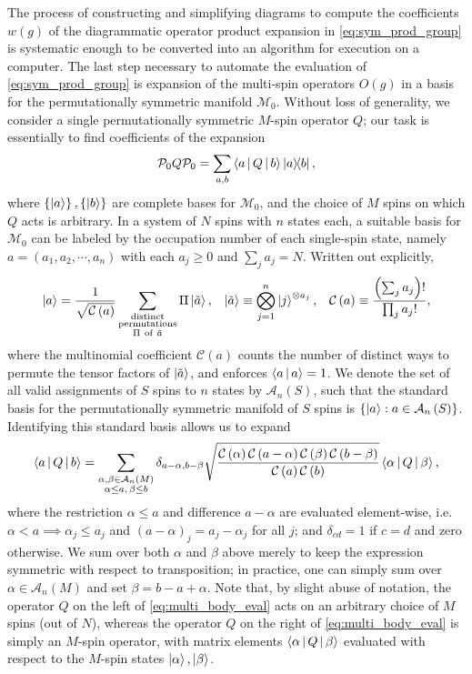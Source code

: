 \documentclass[nofootinbib,notitlepage,11pt]{revtex4-2}
\renewcommand{\t}{\text} %
\newcommand{\f}[2]{\dfrac{#1}{#2}} %
\newcommand{\p}[1]{\left(#1\right)} %
\renewcommand{\set}[1]{\left\{#1\right\}} %
\newcommand{\bk}{\Braket} %
\newcommand{\1}{\mathds{1}}
\newcommand{\A}{\mathcal{A}}
\newcommand{\C}{\mathcal{C}}
\newcommand{\M}{\mathcal{M}}
\renewcommand{\P}{\mathcal{P}}
\begin{document}
The process of constructing and simplifying diagrams to compute the
coefficients $w\p{g}$ of the diagrammatic operator product expansion
in \eqref{eq:sym_prod_group} is systematic enough to be converted into
an algorithm for execution on a computer.  The last step necessary to
automate the evaluation of \eqref{eq:sym_prod_group} is expansion of
the multi-spin operators $O\p{g}$ in a basis for the permutationally
symmetric manifold $\M_0$.  Without loss of generality, we consider a
single permutationally symmetric $M$-spin operator $Q$; our task is
essentially to find coefficients of the expansion
\begin{align}
  \P_0 Q \P_0
  = \sum_{a,b} \bk{a|Q|b} \op{a}{b},
\end{align}
where $\set{\ket{a}},\set{\ket{b}}$ are complete bases for $\M_0$, and
the choice of $M$ spins on which $Q$ acts is arbitrary.  In a system
of $N$ spins with $n$ states each, a suitable basis for $\M_0$ can be
labeled by the occupation number of each single-spin state, namely
$a=\p{a_1,a_2,\cdots,a_n}$ with each $a_j\ge 0$ and $\sum_ja_j=N$.
Written out explicitly,
\begin{align}
  \ket{a} = \f1{\sqrt{\C\p{a}}}
  \sum_{\substack{\t{distinct}\\\t{permutations}\\\Pi~\t{of}~\tilde a}}
  \Pi \ket{\tilde a},
  &&
  \ket{\tilde a} \equiv \bigotimes_{j=1}^n \ket{j}^{\otimes a_j},
  &&
  \C\p{a} \equiv \f{\p{\sum_j a_j}!}{\prod_ja_j!},
\end{align}
where the multinomial coefficient $\C\p{a}$ counts the number of
distinct ways to permute the tensor factors of $\ket{\tilde a}$, and
enforces $\bk{a|a}=1$.  We denote the set of all valid assignments of
$S$ spins to $n$ states by $\A_n\p{S}$, such that the standard basis
for the permutationally symmetric manifold of $S$ spins is
$\set{\ket{a}:a\in\A_n\p{S}}$.  Identifying this standard basis allows
us to expand
\begin{align}
  \bk{a|Q|b}
  = \sum_{\substack{\alpha,\beta\in\A_n\p{M}\\\alpha\le a,\,\beta\le b}}
  \delta_{a-\alpha,b-\beta}
  \sqrt{\f{\C\p{\alpha}\C\p{a-\alpha}\C\p{\beta}\C\p{b-\beta}}
    {\C\p{a}\C\p{b}}}
  \bk{\alpha|Q|\beta},
  \label{eq:multi_body_eval}
\end{align}
where the restriction $\alpha\le a$ and difference $a-\alpha$ are
evaluated element-wise, i.e.~$\alpha<a\implies \alpha_j\le a_j$ and
$\p{a-\alpha}_j=a_j-\alpha_j$ for all $j$; and $\delta_{cd}=1$ if
$c=d$ and zero otherwise.  We sum over both $\alpha$ and $\beta$ above
merely to keep the expression symmetric with respect to transposition;
in practice, one can simply sum over $\alpha\in\A_n\p{M}$ and set
$\beta=b-a+\alpha$.  Note that, by slight abuse of notation, the
operator $Q$ on the left of \eqref{eq:multi_body_eval} acts on an
arbitrary choice of $M$ spins (out of $N$), whereas the operator $Q$
on the right of \eqref{eq:multi_body_eval} is simply an $M$-spin
operator, with matrix elements $\bk{\alpha|Q|\beta}$ evaluated with
respect to the $M$-spin states $\ket\alpha,\ket\beta$.
\end{document}
